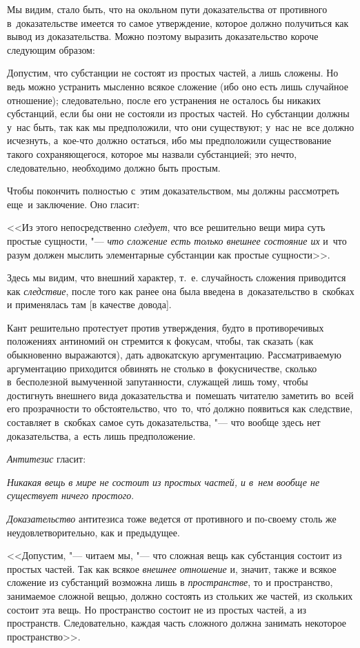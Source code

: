 Мы видим, стало быть, что на окольном пути доказательства от
противного в~доказательстве имеется то самое утверждение, которое
должно получиться как вывод из доказательства. Можно поэтому
выразить доказательство короче следующим образом:

Допустим, что субстанции не состоят из простых частей, а лишь сложены.
Но ведь можно устранить мысленно всякое сложение (ибо оно есть лишь случайное
отношение); следовательно, после его устранения не осталось бы никаких
субстанций, если бы они не состояли из простых частей. Но субстанции должны
у~нас быть, так как мы предположили, что они существуют; у~нас не~все должно
исчезнуть, а~кое-что должно остаться, ибо мы предположили существование такого
сохраняющегося, которое мы назвали субстанцией; это нечто, следовательно,
необходимо должно быть простым.

Чтобы покончить полностью с~этим доказательством, мы должны рассмотреть
еще~и заключение. Оно гласит:

<<Из этого непосредственно {\em следует}, что все решительно вещи мира суть
простые сущности, "--- {\em что сложение есть только внешнее состояние их}
и~что разум должен мыслить элементарные субстанции как простые сущности>>.

Здесь мы видим, что внешний характер, т.~е. случайность сложения приводится
как {\em следствие}, после того как ранее она была введена в~доказательство
в~скобках и применялась там [в качестве довода].

Кант решительно протестует против утверждения, будто в противоречивых
положениях антиномий он стремится к фокусам, чтобы, так сказать (как
обыкновенно выражаются), дать адвокатскую аргументацию. Рассматриваемую
аргументацию приходится обвинять не столько в~фокусничестве, сколько
в~бесполезной вымученной запутанности, служащей лишь тому, чтобы достигнуть
внешнего вида доказательства и~помешать читателю заметить во~всей его
прозрачности то обстоятельство, что~то, чт\'{о} должно появиться как следствие,
составляет в~скобках самое суть доказательства, "--- что вообще здесь
нет доказательства, а~есть лишь предположение.

{\em Антитезис} гласит:

{\em Никакая вещь в мире не состоит из простых частей,
и в~нем вообще не существует ничего простого}.

{\em Доказательство} антитезиса тоже ведется от противного и по-своему
столь же неудовлетворительно, как и предыдущее.

<<Допустим, "--- читаем мы, "--- что сложная вещь как субстанция состоит из
простых частей. Так как всякое {\em внешнее отношение} и, значит, также и
всякое сложение из субстанций возможна лишь в {\em пространстве}, то
и пространство, занимаемое сложной вещью, должно состоять из стольких же
частей, из скольких состоит эта вещь. Но пространство состоит не из простых
частей, а из пространств. Следовательно, каждая часть сложного должна занимать
некоторое пространство>>.

